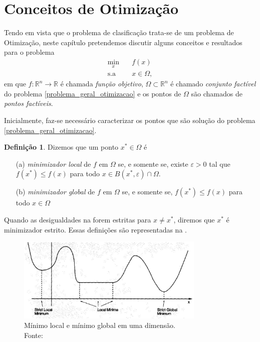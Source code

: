 \documentclass[12pt,a4paper]{scrartcl}
\def\RR{\mathds{R}}
\theoremstyle{definition}%
\newtheorem{defi}{Definição}
\begin{document}
\newpage
\section{Conceitos de Otimização}


Tendo em vista que o problema de clasificação trata-se de um problema de Otimização, neste capítulo pretendemos discutir alguns conceitos e resultados para o problema 
\[ \label{problema_geral_otimizacao}
\begin{aligned}
\min_{x} & \quad f(x) \\
\text{s.a} & \quad x \in \Omega ,
\end{aligned}
\]
em que $f: \RR^{n} \rightarrow \RR$ é chamada \emph{função objetivo}, $\Omega \subset \RR^{n}$ é chamado \emph{conjunto factível} do problema \eqref{problema_geral_otimizacao} e os pontos de $\Omega$ são chamados de \emph{pontos factíveis}.

Inicialmente, faz-se necessário caracterizar os pontos que são solução do problema \eqref{problema_geral_otimizacao}.

\begin{defi} \label{defi:minimizador_local_global}
Dizemos que um ponto $x^{*} \in \Omega$ é
\begin{enumerate}
	\item[(a)] \emph{minimizador local} de $f$ em $\Omega$ se, e somente se, existe $\varepsilon >0$ tal que $f(x^{*}) \leq f(x)$ para todo $x \in B(x^{*}, \varepsilon) \cap \Omega$.

	\item[(b)] \emph{minimizador global} de $f$ em $\Omega$ se, e somente se, $f(x^{*}) \leq f(x)$ para todo $x \in \Omega$
\end{enumerate} 
\end{defi}

Quando as desigualdades na  forem estritas para $x \neq x^{*}$, diremos que $x^{*}$ é minimizador estrito. Essas definições são representadas na .

\begin{figure}[!h] 
	\centering
	\includegraphics[width=0.80\textwidth]{minimo_local_global_grafico}
	\caption{ Mínimo local e mínimo global em uma dimensão. \\ Fonte: \textcite{Bertsekas:1999ua} \label{fig:grafico_minimo_local_global}}
\end{figure}
\end{document}
